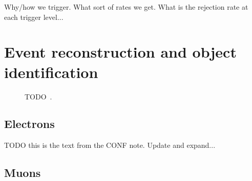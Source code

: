 {\color{red} Why/how we trigger. What sort of rates we get. What is the
rejection rate at each trigger level...}

\FloatBarrier
\section{Event reconstruction and object identification}

\begin{figure}[ht]
  \caption{{\color{red}TODO}~\cite{Pequenao:1505342}.}
  \label{fig:particle_signatures}
\end{figure}

\FloatBarrier
\subsection{Electrons} 
\label{sec:elctrons}

{\color{red} TODO this is the text from the CONF note. Update and expand...}

\FloatBarrier
\subsection{Muons} 
\label{sec:muons}

